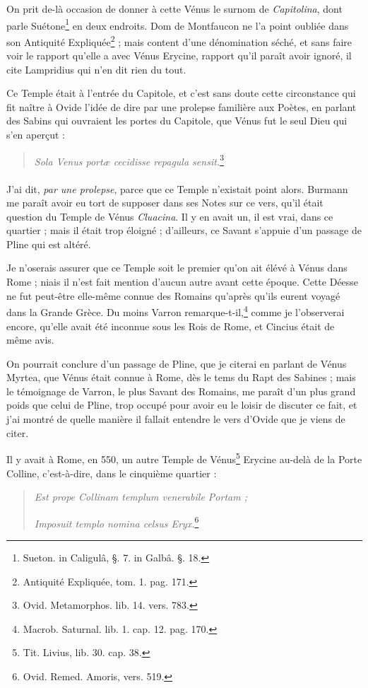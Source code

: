 \documentclass[a4paper, 18pt, oneside]{article}
\begin{document}
On prit de-là occasion de donner à cette Vénus le surnom de \emph{Capitolina}, dont parle Suétone\footnote{Sueton. in Caligulâ, §. 7. in Galbâ. §. 18.} en deux endroits. Dom de Montfaucon ne l'a point oubliée dans son Antiquité Expliquée\footnote{Antiquité Expliquée, tom. 1. pag. 171.} ; mais content d'une dénomination séché, et sans faire voir le rapport qu'elle a avec Vénus Erycine, rapport qu'il paraît avoir ignoré, il cite Lampridius qui n'en dit rien du tout.

Ce Temple était à l'entrée du Capitole, et c'est sans doute cette circonstance qui fit naître à Ovide l'idée de dire par une prolepse familière aux Poètes, en parlant des Sabins qui ouvraient les portes du Capitole, que Vénus fut le seul Dieu qui s'en aperçut :
\begin{quotation}
\emph{Sola Venus portæ cecidisse repagula sensit.}\footnote{Ovid. Metamorphos. lib. 14. vers. 783.}
\end{quotation}
\paragraph{}
J'ai dit, \emph{par une prolepse}, parce que ce Temple n'existait point alors. Burmann me paraît avoir eu tort de supposer dans ses Notes sur ce vers, qu'il était question du Temple de Vénus \emph{Cluacina}. Il y en avait un, il est vrai, dans ce quartier ; mais il était trop éloigné ; d'ailleurs, ce Savant s'appuie d'un passage de Pline qui est altéré.

Je n'oserais assurer que ce Temple soit le premier qu'on ait élévé à Vénus dans Rome ; niais il n'est fait mention d'aucun autre avant cette époque. Cette Déesse ne fut peut-être elle-même connue des Romains qu'après qu'ils eurent voyagé dans la Grande Grèce. Du moins Varron remarque-t-il,\footnote{Macrob. Saturnal. lib. 1. cap. 12. pag. 170.} comme je l'observerai encore, qu'elle avait été inconnue sous les Rois de Rome, et Cincius était de même avis.

On pourrait conclure d'un passage de Pline, que je citerai en parlant de Vénus Myrtea, que Vénus était connue à Rome, dès le tems du Rapt des Sabines ; mais le témoignage de Varron, le plus Savant des Romains, me paraît d'un plus grand poids que celui de Pline, trop occupé pour avoir eu le loisir de discuter ce fait, et j'ai montré de quelle manière il fallait entendre le vers d'Ovide que je viens de citer.

Il y avait à Rome, en 550, un autre Temple de Vénus\footnote{Tit. Livius, lib. 30. cap. 38.} Erycine au-delà de la Porte Colline, c'est-à-dire, dans le cinquième quartier :
\begin{quotation}
\emph{Est prope Collinam templum venerabile Portam ;}

\hspace*{5mm}\emph{Imposuit templo nomina celsus Eryx.}\footnote{Ovid. Remed. Amoris, vers. 519.}
\end{quotation}
\end{document}
